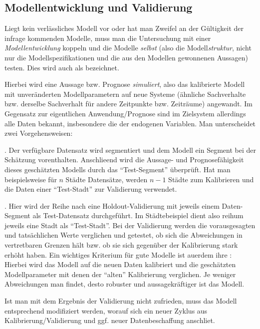 \subsection{Modellentwicklung und Validierung}


Liegt kein verl\"assliches Modell vor oder hat man Zweifel an der
G\"ultigkeit der infrage kommenden Modelle, 
muss man die Untersuchung mit einer \textit{Modellentwicklung} koppeln
und die Modelle  \textit{selbst} (also die Modell\emph{struktur}, 
nicht nur die Modellspezifikationen
und  die aus den Modellen  gewonnenen
Aussagen) testen. Dies wird auch als  bezeichnet.

Hierbei wird eine Aussage bzw. Prognose \textit{simuliert}, also das
kalibrierte Modell mit 
unver\"anderten Modellparametern auf
neue Systeme (\"ahnliche Sachverhalte bzw. derselbe Sachverhalt 
f\"ur andere Zeitpunkte bzw. Zeitr\"aume)  angewandt. Im Gegensatz zur
eigentlichen Anwendung/Prognose sind im Zielsystem allerdings alle
Daten bekannt, insbesondere die der endogenen Variablen. Man
unterscheidet zwei Vorgehensweisen:
\bi
\item {}. Der verf\"ugbare Datensatz wird
  segmentiert und dem Modell ein Segment bei
  der Sch\"atzung vorenthalten. Anschlie\3end wird die Aussage- und
  Prognosef\"ahigkeit dieses gesch\"atzten Modells durch das
  ``Test-Segment'' \"uber\-pr\"uft. Hat man beispielsweise
 f\"ur $n$ St\"adte Datens\"atze, werden $n-1$ St\"adte zum
 Kalibrieren und  die Daten einer ``Test-Stadt'' zur Validierung verwendet.
\item {}. Hier wird der Reihe nach eine
  Holdout-Validierung mit jeweils einem Daten-Segment als
  Test-Datensatz durchgef\"uhrt. Im St\"adtebeispiel dient also reihum
  jeweils eine Stadt als ``Test-Stadt''.
\ei
Bei der
Validierung werden die vorausgesagten und tats\"achlichen Werte
verglichen und getestet, ob
sich die Abweichungen in vertretbaren Grenzen h\"alt bzw. ob sie sich
gegen\"uber der Kalibrierung stark erh\"oht haben. Ein wichtiges
Kriterium f\"ur gute Modelle ist au\3erdem ihre : Hierbei
wird das Modell auf die neuen Daten kalibriert und die
gesch\"atzten Modellparameter mit denen der ``alten'' Kalibrierung
verglichen. Je weniger Abweichungen man findet, desto robuster und
aussagekr\"aftiger ist das Modell.

Ist man mit dem Ergebnis der Validierung nicht zufrieden, muss das
Modell entsprechend modifiziert werden, worauf sich ein neuer Zyklus aus
Kalibrierung/Validierung und ggf. neuer Datenbeschaffung anschlie\3t.

